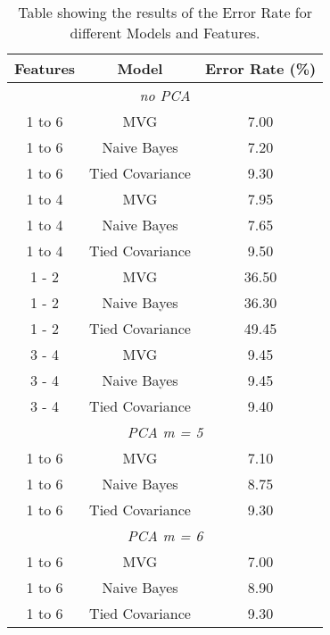 \begin{table}
    \centering
    \begin{tabular}{c c c}
        \toprule
        \textbf{Features} & \textbf{Model}  & \textbf{Error Rate} (\%) \\
        \midrule
        \multicolumn{3}{c}{\textit{no PCA}} \\
        \midrule
        1 to 6            & MVG             & 7.00                     \\
        1 to 6            & Naive Bayes     & 7.20                     \\
        1 to 6            & Tied Covariance & 9.30                     \\
        \midrule
        1 to 4            & MVG             & 7.95                     \\
        1 to 4            & Naive Bayes     & 7.65                     \\
        1 to 4            & Tied Covariance & 9.50                     \\
        \midrule
        1 - 2             & MVG             & 36.50                    \\
        1 - 2             & Naive Bayes     & 36.30                    \\
        1 - 2             & Tied Covariance & 49.45                    \\
        \midrule
        3 - 4             & MVG             & 9.45                     \\
        3 - 4             & Naive Bayes     & 9.45                     \\
        3 - 4             & Tied Covariance & 9.40                     \\
        \midrule
        \multicolumn{3}{c}{\textit{PCA m = 5}} \\
        \midrule
        1 to 6            & MVG             & 7.10                     \\
        1 to 6            & Naive Bayes     & 8.75                     \\
        1 to 6            & Tied Covariance & 9.30                     \\
        \midrule
        \multicolumn{3}{c}{\textit{PCA m = 6}} \\
        \midrule
        1 to 6            & MVG             & 7.00                     \\
        1 to 6            & Naive Bayes     & 8.90                     \\
        1 to 6            & Tied Covariance & 9.30                     \\
        \bottomrule
    \end{tabular}
    \captionsetup{justification=justified,singlelinecheck=false,format=hang}
    \caption{Table showing the results of the Error Rate for different Models and Features.}
    \label{tab:resultGaussianClassificationModels}
\end{table}

